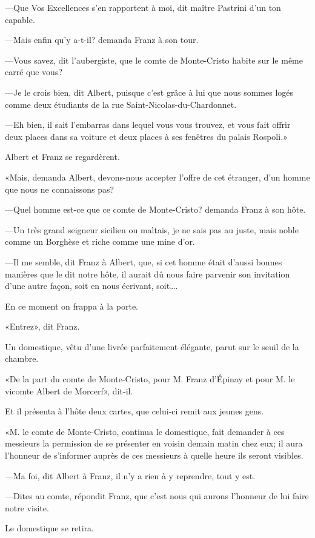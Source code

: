 —Que Vos Excellences s'en rapportent à moi, dit maître Pastrini d'un ton capable. 

—Mais enfin qu'y a-t-il? demanda Franz à son tour. 

—Vous savez, dit l'aubergiste, que le comte de Monte-Cristo habite sur le même carré que vous? 

—Je le crois bien, dit Albert, puisque c'est grâce à lui que nous sommes logés comme deux étudiants de la rue Saint-Nicolas-du-Chardonnet. 

—Eh bien, il sait l'embarras dans lequel vous vous trouvez, et vous fait offrir deux places dans sa voiture et deux places à ses fenêtres du palais Rospoli.» 

Albert et Franz se regardèrent. 

«Mais, demanda Albert, devons-nous accepter l'offre de cet étranger, d'un homme que nous ne connaissons pas? 

—Quel homme est-ce que ce comte de Monte-Cristo? demanda Franz à son hôte.  

—Un très grand seigneur sicilien ou maltais, je ne sais pas au juste, mais noble comme un Borghèse et riche comme une mine d'or. 

—Il me semble, dit Franz à Albert, que, si cet homme était d'aussi bonnes manières que le dit notre hôte, il aurait dû nous faire parvenir son invitation d'une autre façon, soit en nous écrivant, soit\dots. 

En ce moment on frappa à la porte. 

«Entrez», dit Franz. 

Un domestique, vêtu d'une livrée parfaitement élégante, parut sur le seuil de la chambre.  

«De la part du comte de Monte-Cristo, pour M. Franz d'Épinay et pour M. le vicomte Albert de Morcerf», dit-il. 

Et il présenta à l'hôte deux cartes, que celui-ci remit aux jeunes gens. 

«M. le comte de Monte-Cristo, continua le domestique, fait demander à ces messieurs la permission de se présenter en voisin demain matin chez eux; il aura l'honneur de s'informer auprès de ces messieurs à quelle heure ils seront visibles. 

—Ma foi, dit Albert à Franz, il n'y a rien à y reprendre, tout y est.  

—Dites au comte, répondit Franz, que c'est nous qui aurons l'honneur de lui faire notre visite. 

Le domestique se retira. 

